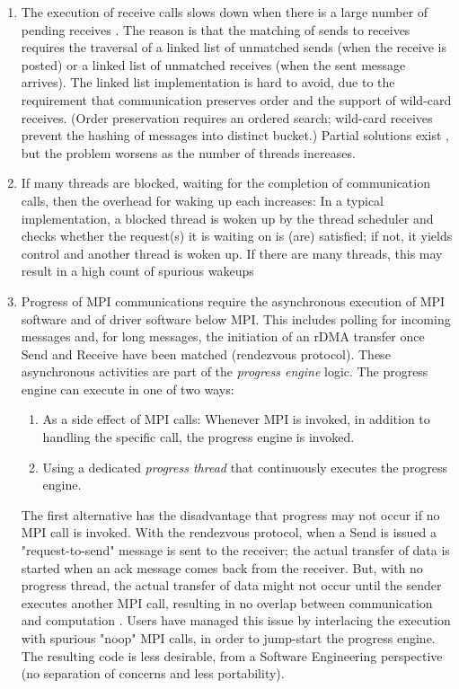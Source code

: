 \begin{enumerate}
			\item 
			The execution of receive calls slows down when there is a large 
			number of pending receives 
			\cite{brightwellseastarqueue,ferreira2017characterizing}. The 
			reason is that the 
			matching of sends to receives requires the traversal of a linked 
			list of unmatched sends (when the receive is posted) or a linked 
			list of unmatched receives (when the sent message arrives). The 
			linked list implementation is hard to avoid, due to the requirement 
			that communication preserves order and the support of wild-card 
			receives. (Order preservation requires an ordered search; wild-card 
			receives prevent the hashing of messages into distinct 
			bucket.) Partial solutions exist \cite{m5}, but the problem worsens 
			as the number of threads increases.
			\item 
			If many threads are blocked, waiting for the completion of 
			communication calls, then the overhead for waking up each
			increases: In a typical implementation, a blocked thread is woken 
			up by the thread scheduler and checks whether the request(s) it is 
			waiting on is (are) satisfied; if not, it yields control and 
			another 
			thread is woken up. If there are many threads, this may result in a 
			high count of spurious wakeups \cite{dang2017advanced}
			\item 
			Progress of MPI communications require the asynchronous execution 
			of MPI software and of driver software below MPI. This includes 
			polling for incoming messages and, for long messages, the 
			initiation of an rDMA transfer once Send and Receive have been 
			matched (rendezvous protocol). These asynchronous activities are 
			part of the \emph{progress engine} logic. The progress engine can 
			execute in one of two ways:
			\begin{enumerate}
				\item
				As a side effect of  MPI calls: Whenever MPI is invoked, in 
				addition to handling the specific call, the progress engine is 
				invoked.
				\item 
				Using a dedicated \emph{progress thread} that continuously 
				executes the progress engine.
						\end{enumerate}
			The first alternative has the disadvantage that progress may not 
			occur if no MPI call is invoked. With the rendezvous protocol, when 
			a Send is issued a "request-to-send" message is sent to the 
			receiver; the actual transfer of data is started when an ack 
			message comes back from the receiver. But, with no progress thread, 
			the actual transfer of data might not occur until the sender 
			executes 
			another MPI call, resulting in no overlap between communication and 
			computation \cite{Denis2016mpioverlap}. Users have managed this 
			issue by interlacing the 
			execution with spurious "noop" MPI calls, in order to jump-start 
			the progress engine. The resulting code is less desirable, from a 
			Software Engineering perspective (no separation of concerns and 
			less portability).
			

\end{enumerate}
